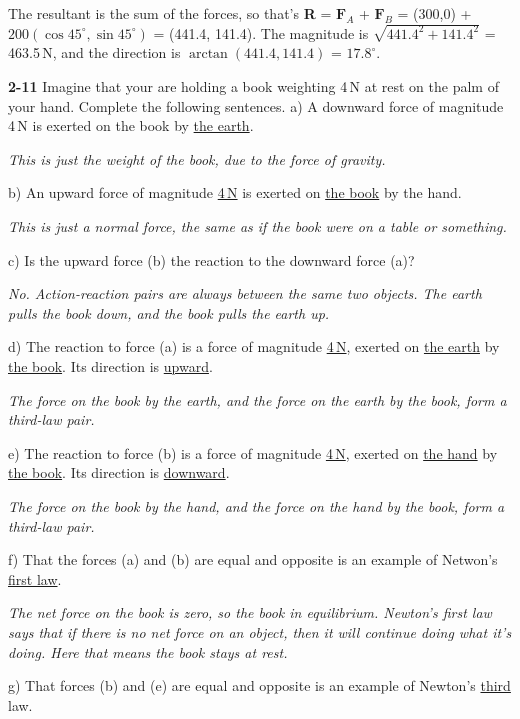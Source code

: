 \documentclass{amsart}
\begin{document}
The resultant is the sum of the forces, so that's \textbf{R} = $\textbf{F}_A$ + $\textbf{F}_B$ =
(300,0) + $200 (\cos 45^\circ, \sin 45^\circ)$ = (441.4, 141.4).  The magnitude is
$\sqrt{441.4^2 + 141.4^2}$ = 463.5\,N, and the direction is $\arctan (441.4, 141.4)$ = $17.8^\circ$.

\vspace{\baselineskip}
\noindent
\textbf{2-11} Imagine that your are holding a book weighting 4\,N at rest on the palm of your hand.
Complete the following sentences.\newline
a) A downward force of magnitude 4\,N is exerted on the book by \underline{the earth}.

\textit{This is just the weight of the book, due to the force of gravity.}

\noindent
b) An upward force of magnitude \underline{4\,N} is exerted on \underline{the book} by the hand.

\textit{This is just a normal force, the same as if the book were on a table or something.}

\noindent
c) Is the upward force (b) the reaction to the downward force (a)?

\textit{No.  Action-reaction pairs are always between the same two objects.  The earth pulls the book down,
and the book pulls the earth up.}

\noindent
d) The reaction to force (a) is a force of magnitude \underline{4\,N},
exerted on \underline{the earth} by \underline{the book}.
Its direction is \underline{upward}.

\textit{The force on the book by the earth, and the force on the earth by the book, form a third-law pair.}

\noindent
e) The reaction to force (b) is a force of magnitude \underline{4\,N}, exerted on \underline{the hand}
by \underline{the book}.  Its direction is \underline{downward}.

\textit{The force on the book by the hand, and the force on the hand by the book, form a third-law pair.}

\noindent
f) That the forces (a) and (b) are equal and opposite is an example of Netwon's \underline{first law}.

\textit{The net force on the book is zero, so the book in equilibrium.  Newton's first law says that if
there is no net force on an object, then it will continue doing what it's doing.
Here that means the book stays at rest.}

\noindent
g) That forces (b) and (e) are equal and opposite is an example of Newton's \underline{third} law.
\end{document}
